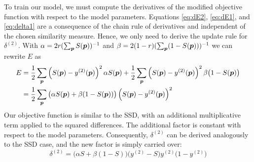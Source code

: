 To train our model, we must compute the derivatives of the modified
objective function with respect to the model parameters. Equations \eqref{eq:dE2},
\eqref{eq:dE1}, and \eqref{eq:delta1} are a consequence of the chain rule of
derivatives and independent of the chosen similarity measure. Hence, we only
need to derive the update rule for $\delta^{(2)}$. With $\alpha = 2r
(\sum_{\vect{p}}S(\vect{p}))^{-1}$ and $\beta = 2(1 -
r)(\sum_{\vect{p}}(1 - S(\vect{p})))^{-1}$ we can rewrite $E$ as
\begin{align} 
E &= \frac{1}{2}\sum_{\vect{p}} \left(S(\vect{p}) - y^{(2)}(\vect{p})\right)^2
\alpha S(\vect{p}) +
\frac{1}{2}\sum_{\vect{p}} \left(S(\vect{p}) - y^{(2)}(\vect{p})\right)^2
\beta\big(1 - S(\vect{p})\big) \\
 &= \frac{1}{2}\sum_{\vect{p}} \big(\alpha S(\vect{p}) +
 \beta(1 - S(\vect{p}))\big)
 \left(S(\vect{p}) - y^{(2)}(\vect{p})\right)^2
\end{align}
Our objective function is similar to the SSD, with an
additional multiplicative term applied to the squared differences. The
additional factor is constant with respect to the
model parameters. Consequently, $\delta^{(2)}$ can be derived
analogously to the SSD case, and the new factor is simply carried over:
\begin{equation} 
\delta^{(2)} = \big(\alpha S + \beta (1 - S)\big)\big(y^{(2)} - S\big) y^{(2)}
\big(1 - y^{(2)}\big)
\end{equation}

